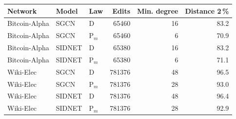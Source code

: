 \begin{tabular}{@{}lllrrr@{}}
\toprule
Network & Model & Law & Edits & Min. degree & Distance 2\,\% \\
\midrule
Bitcoin-Alpha & SGCN & D & 65460 & 16 & 83.2 \\
Bitcoin-Alpha & SGCN & P$_m$ & 65460 & 6 & 70.9 \\
Bitcoin-Alpha & SIDNET & D & 65380 & 16 & 83.2 \\
Bitcoin-Alpha & SIDNET & P$_m$ & 65380 & 6 & 71.1 \\
Wiki-Elec & SGCN & D & 781376 & 48 & 96.5 \\
Wiki-Elec & SGCN & P$_m$ & 781376 & 28 & 93.0 \\
Wiki-Elec & SIDNET & D & 781376 & 48 & 96.4 \\
Wiki-Elec & SIDNET & P$_m$ & 781376 & 28 & 92.9 \\
\bottomrule
\end{tabular}
